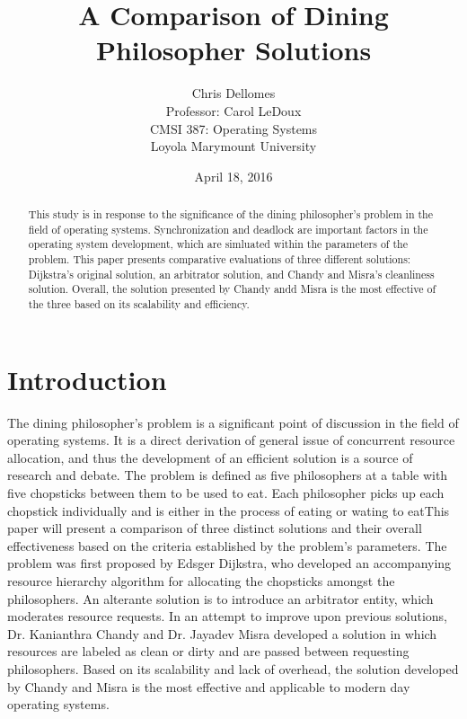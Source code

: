 \documentclass{article}
\begin{document}
\title{A Comparison of Dining Philosopher Solutions}
\author{Chris Dellomes\\
Professor: Carol LeDoux\\
CMSI 387: Operating Systems\\
	Loyola Marymount University}

\date{April 18, 2016}

\maketitle

\begin{center}
\begin{abstract}
This study is in response to the significance of the dining philosopher's problem in the field of operating systems. Synchronization and deadlock are important factors in the operating system development, which are simluated within the parameters of the problem. This paper presents comparative evaluations of three different solutions: Dijkstra's original solution, an arbitrator solution, and Chandy and Misra's cleanliness solution. Overall, the solution presented by Chandy andd Misra is the most effective of the three based on its scalability and efficiency.
\end{abstract}
\end{center}

\thispagestyle{empty}

\clearpage

\setcounter{page}{1}

\section{Introduction} The dining philosopher's problem is a significant point of discussion in the field of operating systems. It is a direct derivation of general issue of concurrent resource allocation, and thus the development of an efficient solution is a source of research and debate. The problem is defined as five philosophers at a table with five chopsticks between them to be used to eat. Each philosopher picks up each chopstick individually and is either in the process of eating or wating to eatThis paper will present a comparison of three distinct solutions and their overall effectiveness based on the criteria established by the problem's parameters. The problem was first proposed by Edsger Dijkstra, who developed an accompanying resource hierarchy algorithm for allocating the chopsticks amongst the philosophers. An alterante solution is to introduce an arbitrator entity, which moderates resource requests. In an attempt to improve upon previous solutions, Dr. Kanianthra Chandy and Dr. Jayadev Misra developed a solution in which resources are labeled as clean or dirty and are passed between requesting philosophers. Based on its scalability and lack of overhead, the solution developed by Chandy and Misra is the most effective and applicable to modern day operating systems.
\end{document}
